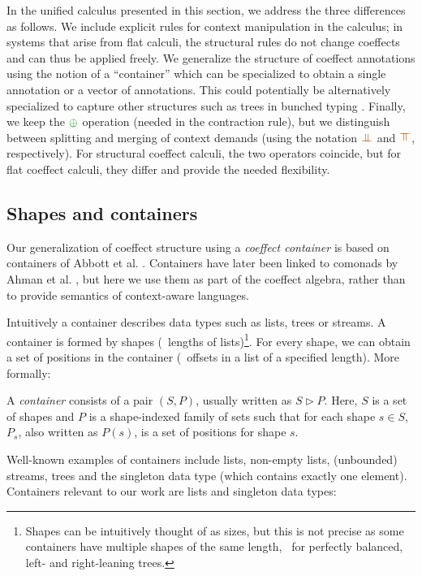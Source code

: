\noindent
In the unified calculus presented in this section, we address the three differences as follows.
We include explicit rules for context manipulation in the calculus; in systems that arise from flat
calculi, the structural rules do not change coeffects and can thus be applied freely. We generalize
the structure of coeffect annotations using the notion of a ``container'' which can be specialized
to obtain a single annotation or a vector of annotations. This could potentially be alternatively
specialized to capture other structures such as trees in bunched typing \cite{substruct-bunched}.
Finally, we keep the $\cpar$ operation (needed in the contraction rule), but we distinguish
between splitting and merging of context demands (using the notation $\apar$
and $\azip$, respectively). For structural coeffect calculi, the two operators coincide, but for flat
coeffect calculi, they differ and provide the needed flexibility.

\subsection{Shapes and containers}
Our generalization of coeffect structure using a \emph{coeffect container} is based on containers of
Abbott et al. \cite{types-containers}. Containers have later been linked to comonads by Ahman et al.
\cite{comonads-containers}, but here we use them as part of the coeffect algebra, rather than to
provide semantics of context-aware languages.

Intuitively a container describes data
types such as lists, trees or streams. A container is formed by shapes (\eg~lengths of
lists)\footnote{Shapes can be intuitively thought of as sizes, but this is not precise
as some containers have multiple shapes of the same length, \eg~for perfectly balanced, left- and right-leaning trees.}.
For every shape, we can obtain a set of positions in the container (\eg~offsets in a list of a
specified length). More formally:

\begin{definition}
A \emph{container} consists of a pair $(S,P)$, usually written as $S \triangleright P$.
Here, $S$ is a set of shapes and $P$ is a shape-indexed family of sets such that
for each shape $s\in S$, $P_s$, also written as $P(s)$, is a set of positions for shape $s$.
\end{definition}

\noindent
Well-known examples of containers include lists, non-empty lists, (un\-boun\-ded) streams,
trees and the singleton data type (which contains exactly one element). Containers relevant
to our work are lists and singleton data types:

